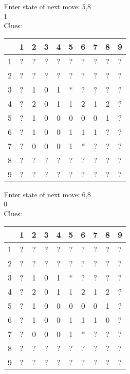 Enter state of next move: 5,8\\
1\\
Clues:\\
\begin{tabular}{|c|c|c|c|c|c|c|c|c|c|}
\hline
  & 1 & 2 & 3 & 4 & 5 & 6 & 7 & 8 & 9\\
\hline
1 & ? & ? & ? & ? & ? & ? & ? & ? & ?\\
\hline
2 & ? & ? & ? & ? & ? & ? & ? & ? & ?\\
\hline
3 & ? & 1 & 0 & 1 & * & ? & ? & ? & ?\\
\hline
4 & ? & 2 & 0 & 1 & 1 & 2 & 1 & 2 & ?\\
\hline
5 & ? & 1 & 0 & 0 & 0 & 0 & 0 & 1 & ?\\
\hline
6 & ? & 1 & 0 & 0 & 1 & 1 & 1 & ? & ?\\
\hline
7 & ? & 0 & 0 & 0 & 1 & * & ? & ? & ?\\
\hline
8 & ? & ? & ? & ? & ? & ? & ? & ? & ?\\
\hline
9 & ? & ? & ? & ? & ? & ? & ? & ? & ?\\
\hline
\end{tabular}

Enter state of next move: 6,8\\
0\\
Clues:\\
\begin{tabular}{|c|c|c|c|c|c|c|c|c|c|}
\hline
  & 1 & 2 & 3 & 4 & 5 & 6 & 7 & 8 & 9\\
\hline
1 & ? & ? & ? & ? & ? & ? & ? & ? & ?\\
\hline
2 & ? & ? & ? & ? & ? & ? & ? & ? & ?\\
\hline
3 & ? & 1 & 0 & 1 & * & ? & ? & ? & ?\\
\hline
4 & ? & 2 & 0 & 1 & 1 & 2 & 1 & 2 & ?\\
\hline
5 & ? & 1 & 0 & 0 & 0 & 0 & 0 & 1 & ?\\
\hline
6 & ? & 1 & 0 & 0 & 1 & 1 & 1 & 0 & ?\\
\hline
7 & ? & 0 & 0 & 0 & 1 & * & ? & ? & ?\\
\hline
8 & ? & ? & ? & ? & ? & ? & ? & ? & ?\\
\hline
9 & ? & ? & ? & ? & ? & ? & ? & ? & ?\\
\hline
\end{tabular}

